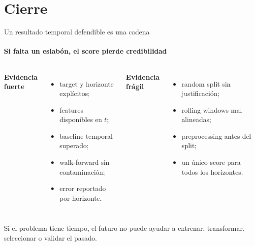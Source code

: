 \documentclass[aspectratio=169,11pt]{beamer}  %
\begin{document}
\section{Cierre}

\begin{frame}{Un resultado temporal defendible es una cadena}
\framesubtitle{Si falta un eslabón, el score pierde credibilidad}
\begin{columns}[T]
\textbf{Evidencia fuerte}
\begin{itemize}\small
\item target y horizonte explícitos;
\item features disponibles en $t$;
\item baseline temporal superado;
\item walk-forward sin contaminación;
\item error reportado por horizonte.
\end{itemize}
\textbf{Evidencia frágil}
\begin{itemize}\small
\item random split sin justificación;
\item rolling windows mal alineadas;
\item preprocessing antes del split;
\item un único score para todos los horizontes.
\end{itemize}
\end{columns}
\begin{keybox}
\small Si el problema tiene tiempo, el futuro no puede ayudar a entrenar, transformar, seleccionar o validar el pasado.
\end{keybox}
\end{frame}
\end{document}
